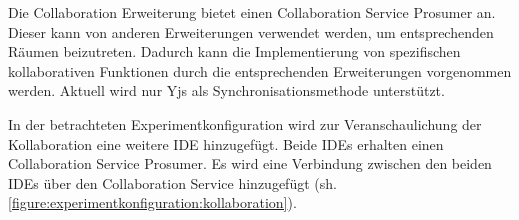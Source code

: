Die Collaboration Erweiterung bietet einen Collaboration Service Prosumer an. Dieser kann von anderen Erweiterungen verwendet werden, um entsprechenden Räumen beizutreten. Dadurch kann die Implementierung von spezifischen kollaborativen Funktionen durch die entsprechenden Erweiterungen vorgenommen werden. Aktuell wird nur Yjs als Synchronisationsmethode unterstützt.

In der betrachteten Experimentkonfiguration wird zur Veranschaulichung der Kollaboration eine weitere IDE hinzugefügt. Beide IDEs erhalten einen Collaboration Service Prosumer. Es wird eine Verbindung zwischen den beiden IDEs über den Collaboration Service hinzugefügt (sh. \autoref{figure:experimentkonfiguration:kollaboration}).